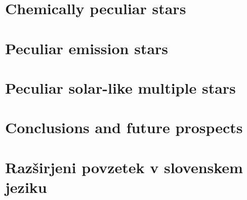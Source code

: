 \chapter{Chemically peculiar stars}
\label{chap:peculiars_chem}


\chapter{Peculiar emission stars}
\label{chap:peculiars_emis}


\chapter{Peculiar solar-like multiple stars}
\label{chap:twins}


\chapter{Conclusions and future prospects}
\label{chap:conclusion}




\cleardoublepage{}
\renewcommand\bibname{Bibliography}





%
%    
%


\cleardoublepage{}
{}
\chapter*{Razširjeni povzetek v slovenskem jeziku}

